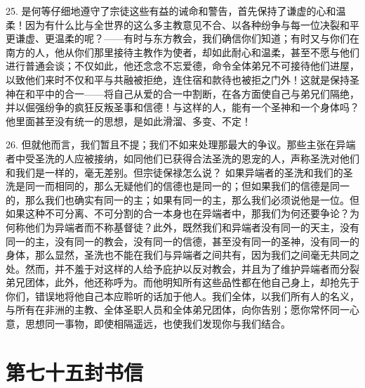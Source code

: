 25. 是何等仔细地遵守了宗徒这些有益的诫命和警告，首先保持了谦虚的心和温柔！因为有什么比与全世界的这么多主教意见不合、以各种纷争与每一位决裂和平更谦虚、更温柔的呢？——有时与东方教会，我们确信你们知道；有时又与你们在南方的人，他从你们那里接待主教作为使者，却如此耐心和温柔，甚至不愿与他们进行普通会谈；不仅如此，他还念念不忘爱德，命令全体弟兄不可接待他们进屋，以致他们来时不仅和平与共融被拒绝，连住宿和款待也被拒之门外！这就是保持圣神在和平中的合一——将自己从爱的合一中割断，在各方面使自己与弟兄们隔绝，并以倔强纷争的疯狂反叛圣事和信德！与这样的人，能有一个圣神和一个身体吗？他里面甚至没有统一的思想，是如此滑溜、多变、不定！\par

26. 但就他而言，我们暂且不提；我们不如来处理那最大的争议。那些主张在异端者中受圣洗的人应被接纳，如同他们已获得合法圣洗的恩宠的人，声称圣洗对他们和我们是一样的，毫无差别。但宗徒保禄怎么说？ 如果异端者的圣洗和我们的圣洗是同一而相同的，那么无疑他们的信德也是同一的；但如果我们的信德是同一的，那么我们也确实有同一的主；如果有同一的主，那么我们必须说他是一位。但如果这种不可分离、不可分割的合一本身也在异端者中，那我们为何还要争论？为何称他们为异端者而不称基督徒？此外，既然我们和异端者没有同一的天主，没有同一的主，没有同一的教会，没有同一的信德，甚至没有同一的圣神，没有同一的身体，那么显然，圣洗也不能在我们与异端者之间共有，因为我们之间毫无共同之处。然而，并不羞于对这样的人给予庇护以反对教会，并且为了维护异端者而分裂弟兄团体，此外，他还称呼为。而他明知所有这些品性都在他自己身上，却抢先于你们，错误地将他自己本应聆听的话加于他人。我们全体，以我们所有人的名义，与所有在非洲的主教、全体圣职人员和全体弟兄团体，向你告别；愿你常怀同一心意，思想同一事物，即使相隔遥远，也使我们发现你与我们结合。\par



\section{第七十五封书信}

\par

